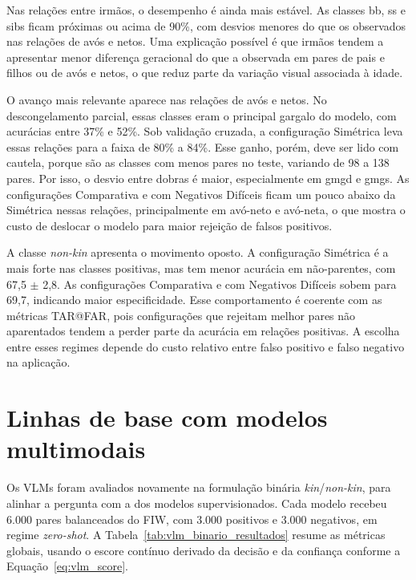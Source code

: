 Nas relações entre irmãos, o desempenho é ainda mais estável. As classes bb, ss e sibs ficam próximas ou acima de 90\%, com desvios menores do que os observados nas relações de avós e netos. Uma explicação possível é que irmãos tendem a apresentar menor diferença geracional do que a observada em pares de pais e filhos ou de avós e netos, o que reduz parte da variação visual associada à idade.

O avanço mais relevante aparece nas relações de avós e netos. No descongelamento parcial, essas classes eram o principal gargalo do modelo, com acurácias entre 37\% e 52\%. Sob validação cruzada, a configuração Simétrica leva essas relações para a faixa de 80\% a 84\%. Esse ganho, porém, deve ser lido com cautela, porque são as classes com menos pares no teste, variando de 98 a 138 pares. Por isso, o desvio entre dobras é maior, especialmente em gmgd e gmgs. As configurações Comparativa e com Negativos Difíceis ficam um pouco abaixo da Simétrica nessas relações, principalmente em avó-neto e avó-neta, o que mostra o custo de deslocar o modelo para maior rejeição de falsos positivos.

A classe \textit{non-kin} apresenta o movimento oposto. A configuração Simétrica é a mais forte nas classes positivas, mas tem menor acurácia em não-parentes, com 67,5 $\pm$ 2,8. As configurações Comparativa e com Negativos Difíceis sobem para 69,7, indicando maior especificidade. Esse comportamento é coerente com as métricas TAR@FAR, pois configurações que rejeitam melhor pares não aparentados tendem a perder parte da acurácia em relações positivas. A escolha entre esses regimes depende do custo relativo entre falso positivo e falso negativo na aplicação.

\section{Linhas de base com modelos multimodais}

Os VLMs foram avaliados novamente na formulação binária \textit{kin}/\textit{non-kin}, para alinhar a pergunta com a dos modelos supervisionados. Cada modelo recebeu 6.000 pares balanceados do FIW, com 3.000 positivos e 3.000 negativos, em regime \textit{zero-shot}. A Tabela~\ref{tab:vlm_binario_resultados} resume as métricas globais, usando o escore contínuo derivado da decisão e da confiança conforme a Equação~\ref{eq:vlm_score}.

